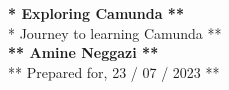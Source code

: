 \begin{titlepage}
    \begin{center}
    {\fontsize{36}{42}\selectfont \bfseries ** Exploring Camunda **} 
    \\\vspace{20pt}
    {\LARGE ** Journey to learning Camunda **} \\
    \vspace{20pt}
    \textbf{** Amine Neggazi **}
    \vspace{8pt}
    \\ ** Prepared for, 23 / 07 / 2023 **
    \end{center}
\end{titlepage}
